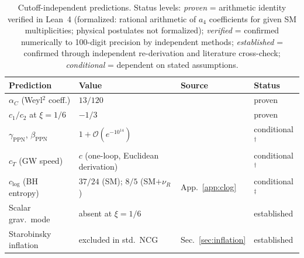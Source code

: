 \documentclass[12pt,a4paper]{article}
\theoremstyle{plain}
\theoremstyle{definition}
\theoremstyle{remark}
\newcommand{\order}{\mathcal{O}}
\begin{document}
\begin{table}[ht]
\centering
\caption{Cutoff-independent predictions.  Status levels:
\emph{proven} = arithmetic identity verified in Lean~4
(formalized: rational arithmetic of $a_4$ coefficients for given
SM multiplicities; physical postulates not formalized);
\emph{verified} = confirmed numerically to 100-digit
precision by independent methods; \emph{established} = confirmed
through independent re-derivation and literature cross-check;
\emph{conditional} = dependent on stated assumptions.}
\label{tab:robust}
\begin{tabular}{p{4.2cm}p{3.5cm}ll}
\toprule
Prediction & Value & Source & Status \\
\midrule
$\alpha_C$ (Weyl${}^2$ coeff.) & $13/120$ & \cite{Alfyorov:2026paper1} & proven \\
$c_1/c_2$ at $\xi = 1/6$ & $-1/3$ & \cite{Alfyorov:2026paper1} & proven \\
$\gamma_{\mathrm{PPN}}$, $\beta_{\mathrm{PPN}}$ &
  $1 + \order(e^{-10^{14}})$ & \cite{Alfyorov:2026paper2} & conditional${}^\dagger$ \\
$c_T$ (GW speed) & $c$ (one-loop, Euclidean derivation) & \cite{Alfyorov:2026paper4} & conditional${}^\dagger$ \\
$c_{\log}$ (BH entropy) & $37/24$ (SM); $8/5$ (SM$+\nu_R$) & App.~\ref{app:clog} & conditional${}^\ddagger$ \\
Scalar grav.\ mode & absent at $\xi = 1/6$ & \cite{CCM:2006,vS:2015} & established \\
Starobinsky inflation & excluded in std.\ NCG & Sec.~\ref{sec:inflation} & established \\
\bottomrule
\end{tabular}

\smallskip{}
\end{table}
\end{document}
